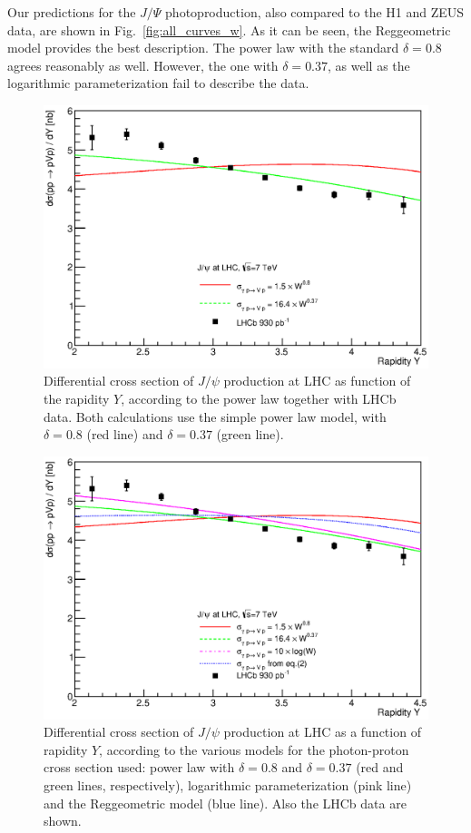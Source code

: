 \documentclass[12pt]{article}
\begin{document}
Our predictions for the $J/\Psi$ photoproduction, also compared to the H1 and ZEUS data, are shown in Fig.~\ref{fig:all_curves_w}.
As it can be seen, the Reggeometric model provides the best description.
The power law with the standard $\delta=0.8$ agrees reasonably as well.
However, the one with $\delta=0.37$, as well as the logarithmic parameterization fail to describe the data.

\begin{figure}[!h]
\centering
 \includegraphics[width=.8\textwidth]{figures/dSigma_dy_comparison2.eps}
 \caption{Differential cross section of $J/\psi$ production at LHC as function of the rapidity $Y$, according to the power law  together with LHCb data.
          Both calculations use the simple power law model, with $\delta=0.8$ (red line) and $\delta=0.37$ (green line).}
 \label{fig:delta_fit}
\end{figure}

\begin{figure}[p]
\centering
 \includegraphics[width=.8\textwidth]{figures/dSigma_dy_comparison3.eps}
 \caption{Differential cross section of $J/\psi$ production at LHC as a function of rapidity $Y$, according to the various models for the photon-proton cross section used: power law with $\delta=0.8$ and $\delta=0.37$ (red and green lines, respectively), logarithmic parameterization (pink line) and the Reggeometric model (blue line). Also the LHCb data are shown.}
  \label{fig:all_curves}
\end{figure}
\end{document}
